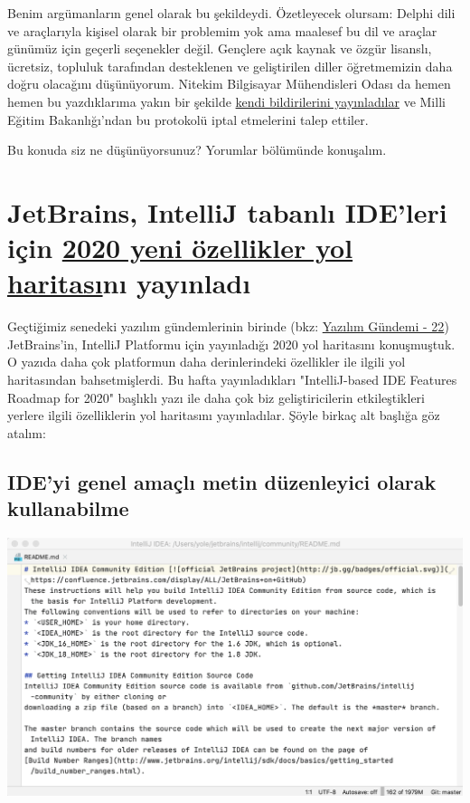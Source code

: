 \documentclass[11pt]{article}
\begin{document}
Benim argümanların genel olarak bu şekildeydi. Özetleyecek olursam: Delphi dili
ve araçlarıyla kişisel olarak bir problemim yok ama maalesef bu dil ve araçlar
günümüz için geçerli seçenekler değil. Gençlere açık kaynak ve özgür lisanslı,
ücretsiz, topluluk tarafından desteklenen ve geliştirilen diller öğretmemizin
daha doğru olacağını düşünüyorum. Nitekim Bilgisayar Mühendisleri Odası da
hemen hemen bu yazdıklarıma yakın bir şekilde \href{https://www.bmo.org.tr/2020/01/23/mebin-teknik-liselerde-yazilim-egitimi-yontemi-cagdisidir/}{kendi bildirilerini yayınladılar}
ve Milli Eğitim Bakanlığı'ndan bu protokolü iptal etmelerini talep ettiler.

Bu konuda siz ne düşünüyorsunuz? Yorumlar bölümünde konuşalım.
\section{JetBrains, IntelliJ tabanlı IDE'leri için \href{https://blog.jetbrains.com/idea/2020/01/intellij-based-ide-features-roadmap-for-2020/}{2020 yeni özellikler yol haritası}nı yayınladı}
\label{sec:org07920a7}
Geçtiğimiz senedeki yazılım gündemlerinin birinde (bkz: \href{../../2019/22/yazilim-gundemi-22.pdf}{Yazılım Gündemi - 22})
JetBrains'in, IntelliJ Platformu için yayınladığı 2020 yol haritasını
konuşmuştuk. O yazıda daha çok platformun daha derinlerindeki özellikler ile
ilgili yol haritasından bahsetmişlerdi. Bu hafta yayınladıkları "IntelliJ-based
IDE Features Roadmap for 2020" başlıklı yazı ile daha çok biz geliştiricilerin
etkileştikleri yerlere ilgili özelliklerin yol haritasını yayınladılar. Şöyle
birkaç alt başlığa göz atalım:

\subsection{IDE'yi genel amaçlı metin düzenleyici olarak kullanabilme}
\label{sec:org5cb234e}
\begin{center}
\includegraphics[width=.9\linewidth]{gorseller/jetbrains-text-mode.png}
\end{center}
\end{document}
